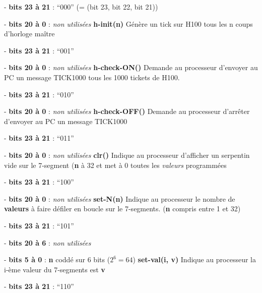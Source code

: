 \documentclass[10pt]{article}
\begin{document}
        - \textbf{bits 23 à 21} : ``000'' (= (bit 23, bit 22, bit 21))

        - \textbf{bits 20 à 0} : \textit{non utilisées}
        \newline
        \newline
        \textbf{h-init(n)} Génère un tick sur H100 tous les n coups d'horloge maître
        
        - \textbf{bits 23 à 21} : ``001''

        - \textbf{bits 20 à 0} : \textit{non utilisées}
        \newline
        \newline
        \textbf{h-check-ON()} Demande au processeur d'envoyer au PC un message TICK1000 tous les 1000 tickets de H100.
        
        - \textbf{bits 23 à 21} : ``010''

        - \textbf{bits 20 à 0} : \textit{non utilisées}
        \newpage
        \textbf{h-check-OFF()} Demande au processeur d'arrêter d'envoyer au PC un message TICK1000
        
        - \textbf{bits 23 à 21} : ``011''

        - \textbf{bits 20 à 0} : \textit{non utilisées}
        \newline
        \newline
        \textbf{clr()} Indique au processeur d'afficher un serpentin vide sur le 7-segment (\textbf{n} à 32 et met à 0 toutes les \textit{valeurs} programmées
        
        - \textbf{bits 23 à 21} : ``100''

        - \textbf{bits 20 à 0} : \textit{non utilisées}
        \newline
        \newline
        \textbf{set-N(n)} Indique au processeur le nombre de \textbf{valeurs} à faire défiler en boucle sur le 7-segments. (\textbf{n} compris entre 1 et 32)
        
        - \textbf{bits 23 à 21} : ``101''

        - \textbf{bits 20 à 6} : \textit{non utilisées} 

        - \textbf{bits 5 à 0} : \textbf{n} coddé sur 6 bits ($2^6 = 64$)
        \newline
        \newline
        \textbf{set-val(i, v)} Indique au processeur la i-ème valeur du 7-segments est \textbf{v}
        
        - \textbf{bits 23 à 21} : ``110''
\end{document}
